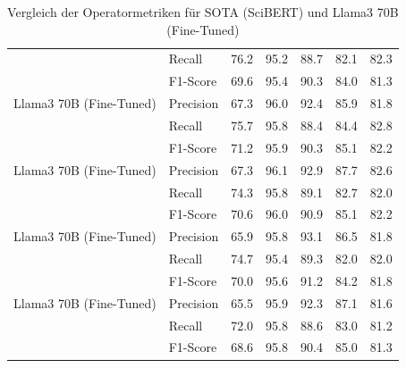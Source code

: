 \begin{table}[!ht]
\begin{tabular}{llrrrrr}
 & Recall & 76.2 & 95.2 & 88.7 & 82.1 & 82.3 \\
 & F1-Score & 69.6 & 95.4 & 90.3 & 84.0 & 81.3 \\
\midrule
Llama3 70B
(Fine-Tuned) & Precision & 67.3 & 96.0 & 92.4 & 85.9 & 81.8 \\
 & Recall & 75.7 & 95.8 & 88.4 & 84.4 & 82.8 \\
 & F1-Score & 71.2 & 95.9 & 90.3 & 85.1 & 82.2 \\
\midrule
Llama3 70B
(Fine-Tuned) & Precision & 67.3 & 96.1 & 92.9 & 87.7 & 82.6 \\
 & Recall & 74.3 & 95.8 & 89.1 & 82.7 & 82.0 \\
 & F1-Score & 70.6 & 96.0 & 90.9 & 85.1 & 82.2 \\
\midrule
Llama3 70B
(Fine-Tuned) & Precision & 65.9 & 95.8 & 93.1 & 86.5 & 81.8 \\
 & Recall & 74.7 & 95.4 & 89.3 & 82.0 & 82.0 \\
 & F1-Score & 70.0 & 95.6 & 91.2 & 84.2 & 81.8 \\
\midrule
Llama3 70B
(Fine-Tuned) & Precision & 65.5 & 95.9 & 92.3 & 87.1 & 81.6 \\
 & Recall & 72.0 & 95.8 & 88.6 & 83.0 & 81.2 \\
 & F1-Score & 68.6 & 95.8 & 90.4 & 85.0 & 81.3 \\
\bottomrule
\end{tabular}
\caption{Vergleich der Operatormetriken für SOTA (SciBERT) und Llama3 70B (Fine-Tuned)}
\label{tab:operator_metrics}
\end{table}